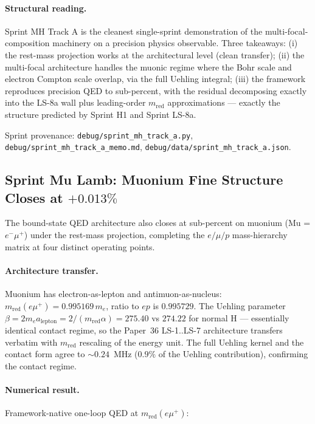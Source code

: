 \documentclass[11pt]{article}
\begin{document}
\paragraph{Structural reading.}  Sprint MH Track A is the cleanest
single-sprint demonstration of the multi-focal-composition machinery
on a precision physics observable.  Three takeaways: (i) the rest-mass
projection works at the architectural level (clean transfer);
(ii) the multi-focal architecture handles the muonic regime where the
Bohr scale and electron Compton scale overlap, via the full Uehling
integral; (iii) the framework reproduces precision QED to sub-percent,
with the residual decomposing exactly into the LS-8a wall plus
leading-order $m_\text{red}$ approximations --- exactly the structure
predicted by Sprint H1 and Sprint LS-8a.

Sprint provenance: \texttt{debug/sprint\_mh\_track\_a.py},
\texttt{debug/sprint\_mh\_track\_a\_memo.md},
\texttt{debug/data/sprint\_mh\_track\_a.json}.

\subsection{Sprint Mu Lamb: Muonium Fine Structure Closes at $+0.013\%$}
\label{sec:sprint_mu_lamb}

The bound-state QED architecture also closes at sub-percent on muonium
(Mu = $e^- \mu^+$) under the rest-mass projection, completing the
$e/\mu/p$ mass-hierarchy matrix at four distinct operating points.

\paragraph{Architecture transfer.}  Muonium has electron-as-lepton and
antimuon-as-nucleus: $m_\text{red}(e\mu^+) = 0.995169\, m_e$, ratio to
$ep$ is $0.995729$.  The Uehling parameter $\beta = 2 m_e a_\text{lepton} =
2/(m_\text{red} \alpha) = 275.40$ vs $274.22$ for normal H --- essentially
identical contact regime, so the Paper~36 LS-1..LS-7 architecture
transfers verbatim with $m_\text{red}$ rescaling of the energy unit.
The full Uehling kernel and the contact form agree to $\sim 0.24$~MHz
($0.9\%$ of the Uehling contribution), confirming the contact regime.

\paragraph{Numerical result.}  Framework-native one-loop QED at
$m_\text{red}(e\mu^+)$:
\end{document}
